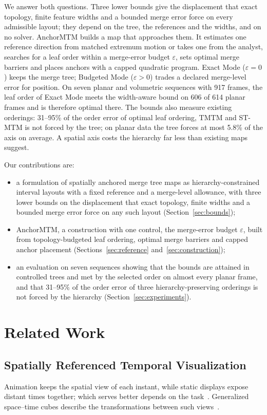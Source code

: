 \documentclass[review]{vgtc}
\begin{document}
We answer both questions. Three lower bounds give the displacement that exact topology, finite feature widths and a bounded merge error force on every admissible layout; they depend on the tree, the references and the widths, and on no solver. AnchorMTM builds a map that approaches them. It estimates one reference direction from matched extremum motion or takes one from the analyst, searches for a leaf order within a merge-error budget $\varepsilon$, sets optimal merge barriers and places anchors with a capped quadratic program. Exact Mode ($\varepsilon=0$) keeps the merge tree; Budgeted Mode ($\varepsilon>0$) trades a declared merge-level error for position. On seven planar and volumetric sequences with 917 frames, the leaf order of Exact Mode meets the width-aware bound on 606 of 614 planar frames and is therefore optimal there. The bounds also measure existing orderings: 31--95\% of the order error of optimal leaf ordering, TMTM and ST-MTM is not forced by the tree; on planar data the tree forces at most 5.8\% of the axis on average. A spatial axis costs the hierarchy far less than existing maps suggest.

Our contributions are:
\begin{itemize}
\setlength{\itemsep}{2pt}
\setlength{\parsep}{0pt}
\item a formulation of spatially anchored merge tree maps as hierarchy-constrained interval layouts with a fixed reference and a merge-level allowance, with three lower bounds on the displacement that exact topology, finite widths and a bounded merge error force on any such layout (Section~\ref{sec:bounds});
\item AnchorMTM, a construction with one control, the merge-error budget $\varepsilon$, built from topology-budgeted leaf ordering, optimal merge barriers and capped anchor placement (Sections~\ref{sec:reference} and~\ref{sec:construction});
\item an evaluation on seven sequences showing that the bounds are attained in controlled trees and met by the selected order on almost every planar frame, and that 31--95\% of the order error of three hierarchy-preserving orderings is not forced by the hierarchy (Section~\ref{sec:experiments}).
\end{itemize}

\section{Related Work}\label{sec:related}
\subsection{Spatially Referenced Temporal Visualization}
Animation keeps the spatial view of each instant, while static displays expose distant times together; which serves better depends on the task~\cite{Tversky:2002:Animation,Robertson:2008:Animation}. Generalized space--time cubes describe the transformations between such views~\cite{Bach:2017:STC}.
\end{document}
